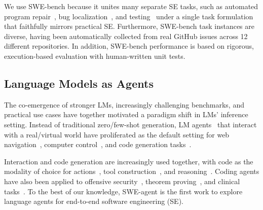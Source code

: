We use SWE-bench because it unites many separate SE tasks, such as automated program repair~\citep{fan2023automated,sobania2023analysis,xia2022less}, bug localization~\citep{chakraborty2018entropy,yang2024localization}, and testing~\citep{kang2023large,wang2023software,xia2023universal} under a single task formulation that faithfully mirrors practical SE.
Furthermore, SWE-bench task instances are diverse, having been automatically collected from real GitHub issues across \num{12} different repositories.
In addition, SWE-bench performance is based on rigorous, execution-based evaluation with human-written unit tests.

\subsection{Language Models as Agents}
The co-emergence of stronger LMs, increasingly challenging benchmarks, and practical use cases have together motivated a paradigm shift in LMs' inference setting.
Instead of traditional zero/few-shot generation, LM agents~\citep{hong2023metagpt,sumers2023cognitive,wang2024survey,xi2023rise} that interact with a real/virtual world have proliferated as the default setting for web navigation~\citep{koh2024visualwebarena,nakano2022webgpt,press-etal-2023-measuring,sridhar2023hierarchical,thoppilan2022lamda,yao2023webshop,yao2023react,zhou2023webarena}, computer control~\citep{packer2024memgpt,wu2024oscopilot,xie2024osworld}, and code generation tasks~\citep{holt2024lmac,wang2023executionbased,yin2022natural}.


Interaction and code generation are increasingly used together, with code as the modality of choice for actions~\citep{wang2024executable,yang2023intercode}, tool construction~\citep{gu2024middleware,wang2024trove,zhang2024training}, and reasoning~\citep{shinn2023reflexion,zelikman2022parsel,zelikman2024selftaught}.
Coding agents have also been applied to offensive security~\citep{fang2024llm,shao2024empirical,yang2023language}, theorem proving~\citep{thakur2024incontext}, and clinical tasks~\citep{shi2024ehragent,tang2024medagents,wornow2024automating}.
To the best of our knowledge, SWE-agent is the first work to explore language agents for end-to-end software engineering (SE).
